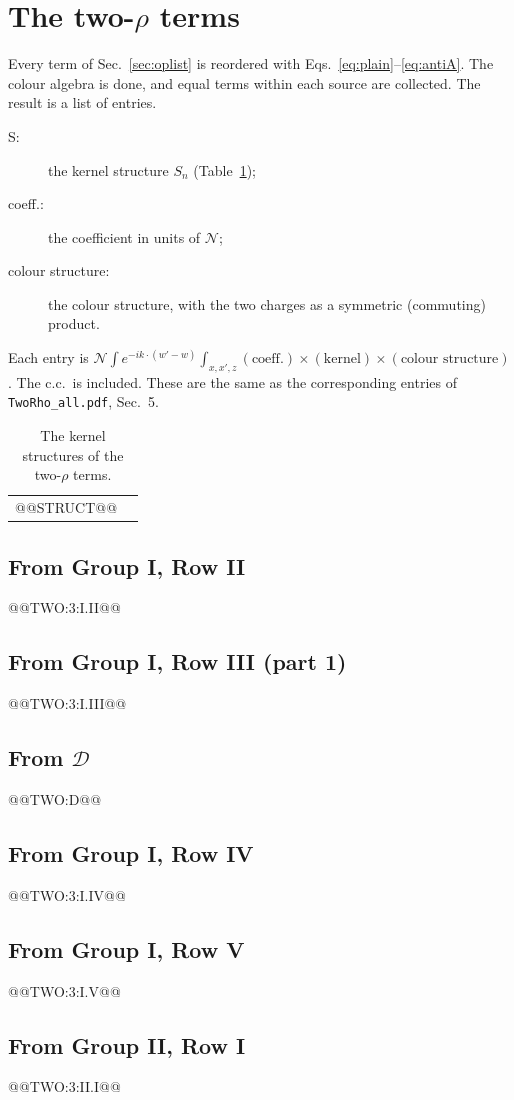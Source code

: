 \documentclass[10pt]{article}
\numberwithin{equation}{section}
\newcommand{\NN}{\mathcal N}
\begin{document}
\section{The two-\texorpdfstring{$\rho$}{rho} terms}\label{sec:two}
Every term of Sec.~\ref{sec:oplist} is reordered with Eqs.~\eqref{eq:plain}--\eqref{eq:antiA}. The colour algebra is done, and equal terms within each source are collected. The result is a list of entries.
\begin{description}
\item[S:] the kernel structure $S_n$ (Table~\ref{tab:struct});
\item[coeff.:] the coefficient in units of $\NN$;
\item[colour structure:] the colour structure, with the two charges as a symmetric (commuting) product.
\end{description}
Each entry is $\NN\int e^{-ik\cdot(w'-w)}\int_{x,x',z}(\text{coeff.})\times(\text{kernel})\times(\text{colour structure})$. The c.c.\ is included. These are the same as the corresponding entries of \texttt{TwoRho\_all.pdf}, Sec.~5.
\begin{table}[H]
\centering\small
\begin{tabular}{@{}l l@{}}
@@STRUCT@@
\end{tabular}
\caption{The kernel structures of the two-$\rho$ terms.}
\label{tab:struct}
\end{table}

\subsection{From Group I, Row II}
@@TWO:3:I.II@@
\subsection{From Group I, Row III (part 1)}
@@TWO:3:I.III@@
\subsection{From \texorpdfstring{$\mathcal D$}{D}}
@@TWO:D@@
\subsection{From Group I, Row IV}
@@TWO:3:I.IV@@
\subsection{From Group I, Row V}
@@TWO:3:I.V@@
\subsection{From Group II, Row I}
@@TWO:3:II.I@@
\end{document}
